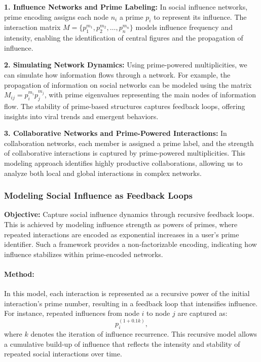 \documentclass{article}
\theoremstyle{plain}
\begin{document}
\begin{enumerate}
\textbf{1. Influence Networks and Prime Labeling:} In social influence networks, prime encoding assigns each node \( n_i \) a prime \( p_i \) to represent its influence. The interaction matrix \( M = \{ p_1^{m_1}, p_2^{m_2}, \ldots, p_n^{m_n} \} \) models influence frequency and intensity, enabling the identification of central figures and the propagation of influence.

\textbf{2. Simulating Network Dynamics:} Using prime-powered multiplicities, we can simulate how information flows through a network. For example, the propagation of information on social networks can be modeled using the matrix \( M_{ij} = p_i^{m_i} p_j^{m_j} \), with prime eigenvalues representing the main nodes of information flow. The stability of prime-based structures captures feedback loops, offering insights into viral trends and emergent behaviors.

\textbf{3. Collaborative Networks and Prime-Powered Interactions:} In collaboration networks, each member is assigned a prime label, and the strength of collaborative interactions is captured by prime-powered multiplicities. This modeling approach identifies highly productive collaborations, allowing us to analyze both local and global interactions in complex networks.

\subsubsection{Modeling Social Influence as Feedback Loops}

\textbf{Objective:} Capture social influence dynamics through recursive feedback loops. This is achieved by modeling influence strength as powers of primes, where repeated interactions are encoded as exponential increases in a user’s prime identifier. Such a framework provides a non-factorizable encoding, indicating how influence stabilizes within prime-encoded networks.

\paragraph{Method:} In this model, each interaction is represented as a recursive power of the initial interaction’s prime number, resulting in a feedback loop that intensifies influence. For instance, repeated influences from node \( i \) to node \( j \) are captured as:
\begin{equation}
    p_i^{(1 + 0.1k)},
\end{equation}
where \( k \) denotes the iteration of influence recurrence. This recursive model allows a cumulative build-up of influence that reflects the intensity and stability of repeated social interactions over time.


\end{enumerate}
\end{document}
